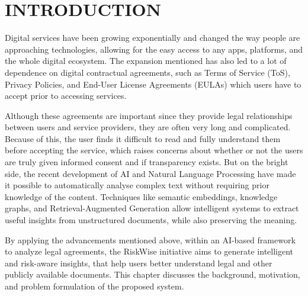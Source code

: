 \chapter{INTRODUCTION} %
\label{ChapterIntroduction} %

Digital services have been growing exponentially and changed the way
people are approaching technologies, allowing for the easy access to
any apps, platforms, and the whole digital ecosystem. 
The expansion mentioned has also led to a lot of dependence on digital contractual agreements, 
such as Terms of Service (ToS), Privacy Policies, and 
End-User License Agreements (EULAs) which users have to accept prior to accessing services.

Although these agreements are important since they provide 
legal relationships between users and service providers, they are 
often very long and complicated. Because of this, the user finds it 
difficult to read and fully understand them before accepting the 
service, which raises concerns about whether or not the users 
are truly given informed consent and if transparency exists.
But on the bright side, the recent development of AI and 
Natural Language Processing have made it possible to automatically 
analyse complex text without requiring prior knowledge of the content. 
Techniques like semantic embeddings, knowledge graphs, and
Retrieval-Augmented Generation allow intelligent systems 
to extract useful insights from unstructured documents, 
while also preserving the meaning.

By applying the advancements mentioned above, within an AI-based framework 
to analyze legal agreements, the RiskWise initiative aims to generate 
intelligent and risk-aware insights, that help users better understand 
legal and other publicly available documents.
This chapter discusses the background, motivation, and problem formulation of the proposed system.

